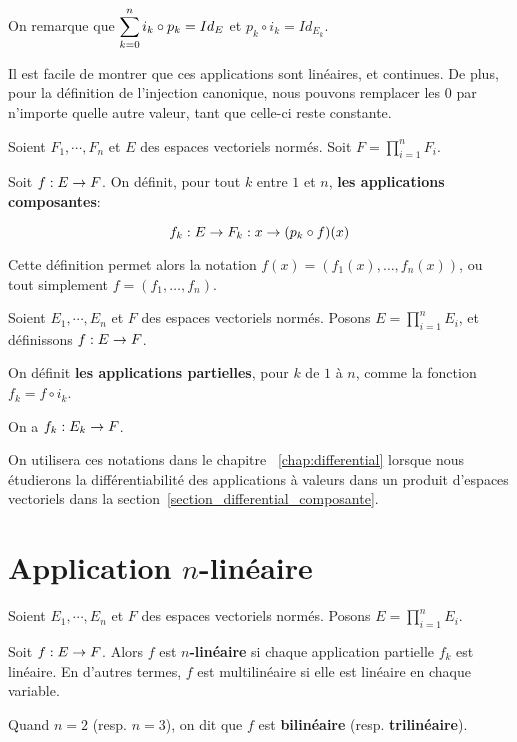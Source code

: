 On remarque que $\displaystyle \sum_{k = 0}^{n} i_{k} \circ p_{k} = Id_{E}$ et $p_{k} \circ
i_{k} = Id_{E_{k}}$.

Il est facile de montrer que ces applications sont linéaires, et continues.
De plus, pour la définition de l'injection canonique, nous pouvons remplacer les
$0$ par n'importe quelle autre valeur, tant que celle-ci reste constante.

\begin{definition} 
	\label{composante_function}
	Soient $F_{1}, \cdots, F_{n}$ et $E$ des espaces vectoriels normés.
	Soit $F = \displaystyle \prod_{i = 1}^{n} F_{i}$.

	Soit $f : E \rightarrow F$. On définit, pour tout $k$ entre $1$ et $n$,
	\textbf{les applications composantes}:

	\begin{equation*}
		f_{k} : E \rightarrow F_{k} : x \rightarrow (p_{k} \circ f) (x)
	\end{equation*}
\end{definition}

Cette définition permet alors la notation $f(x) = (f_{1}(x), \ldots, f_{n}(x))$,
ou tout simplement $f = (f_{1}, \ldots, f_{n})$.

\begin{definition} 
	\label{partial_application}
	Soient $E_{1}, \cdots, E_{n}$ et $F$ des espaces vectoriels normés.
	Posons $E = \displaystyle \prod_{i = 1}^{n} E_{i}$, et définissons
	$f : E \rightarrow F$.

	On définit \textbf{les applications partielles}, pour $k$ de $1$ à
	$n$, comme la fonction $f_{k} = f \circ i_{k}$.

	On a $f_{k} : E_{k} \rightarrow F$.
\end{definition}

On utilisera ces notations dans le chapitre ~\ref{chap:differential} lorsque nous
étudierons la différentiabilité des applications à valeurs dans un produit
d'espaces vectoriels dans la section~\ref{section_differential_composante}.

\section{Application $n$-linéaire}

\begin{definition}
	Soient $E_{1}, \cdots, E_{n}$ et $F$ des espaces vectoriels normés. Posons
	$E = \displaystyle \prod_{i = 1}^{n} E_{i}$.

	Soit $f : E \rightarrow F$. Alors $f$ est \textbf{$n$-linéaire} si chaque
	application partielle $f_{k}$ est linéaire. En d'autres termes, $f$ est
	multilinéaire si elle est linéaire en chaque variable.

	Quand $n = 2$ (resp. $n = 3$), on dit que $f$ est \textbf{bilinéaire} (resp.
	\textbf{trilinéaire}).
\end{definition}

